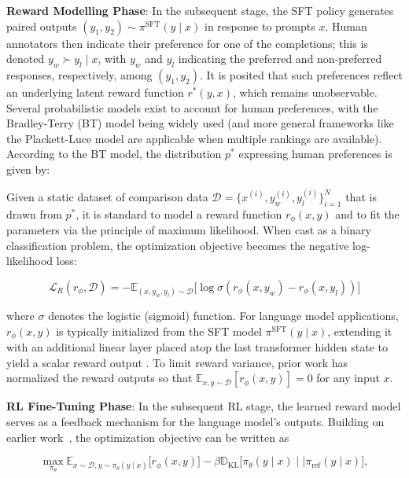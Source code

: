 \textbf{Reward Modelling Phase}: In the subsequent stage, the SFT policy generates paired outputs $(y_1, y_2)\sim \pi^\text{SFT}(y \mid x)$ in response to prompts $x$. Human annotators then indicate their preference for one of the completions; this is denoted $y_w\succ y_l \mid x$, with $y_w$ and $y_l$ indicating the preferred and non-preferred responses, respectively, among $(y_1, y_2)$. It is posited that such preferences reflect an underlying latent reward function $r^*(y, x)$, which remains unobservable. Several probabilistic models exist to account for human preferences, with the Bradley-Terry (BT) model \cite{bradley1952rankanalysis} being widely used (and more general frameworks like the Plackett-Luce model \citep{plackett1975analysis, luce2012individual} are applicable when multiple rankings are available). According to the BT model, the distribution $p^*$ expressing human preferences is given by:

Given a static dataset of comparison data $\mathcal{D}=\bigl\{x^{(i)}, y_w^{(i)}, y_l^{(i)}\bigr\}_{i=1}^N$ that is drawn from $p^*$, it is standard to model a reward function $r_{\phi}(x, y)$ and to fit the parameters via the principle of maximum likelihood. When cast as a binary classification problem, the optimization objective becomes the negative log-likelihood loss:

\begin{equation}\label{eq:reward_model}
    \mathcal{L}_R(r_{\phi}, \mathcal{D}) = -\mathbb{E}_{(x, y_w, y_l)\sim \mathcal{D}}\bigl[\log \sigma(r_{\phi}(x, y_w)- r_{\phi}(x, y_l))\bigr]
\end{equation}

where $\sigma$ denotes the logistic (sigmoid) function. For language model applications, $r_{\phi}(x, y)$ is typically initialized from the SFT model $\pi^\text{SFT}(y \mid x)$, extending it with an additional linear layer placed atop the last transformer hidden state to yield a scalar reward output \cite{ziegler2020finetuning}. To limit reward variance, prior work has normalized the reward outputs so that $\mathbb{E}_{x,y\sim \mathcal{D}}\left[r_\phi(x, y)\right] = 0$ for any input $x$.

\textbf{RL Fine-Tuning Phase}: In the subsequent RL stage, the learned reward model serves as a feedback mechanism for the language model’s outputs. Building on earlier work~\citep{jaques2017sequence, jaques2020human}, the optimization objective can be written as

\begin{equation}\label{eq:RL}
\max_{\pi_{\theta}}  \mathbb{E}_{x\sim \mathcal{D}, y\sim \pi_{\theta}(y \mid x)}\bigl[r_{\phi}(x, y)\bigr] - \beta\mathbb{D}_{\textrm{KL}}\bigl[\pi_{\theta}(y\mid x)\mid \mid \pi_\text{ref}(y\mid x)\bigr],
\end{equation}

